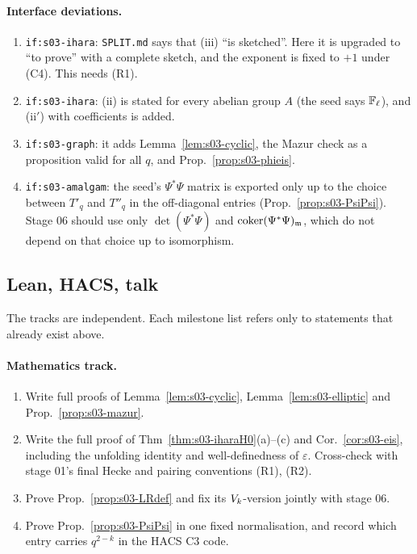\paragraph{Interface deviations.}
\begin{enumerate}[label=(D\arabic*)]
\item \texttt{if:s03-ihara}: \texttt{SPLIT.md} says that (iii) ``is sketched''. Here it is upgraded to ``to prove'' with a complete
  sketch, and the exponent is fixed to $+1$ under (C4). This needs (R1).
\item \texttt{if:s03-ihara}: (ii) is stated for every abelian group $A$ (the seed says $\mathbb{F}_\ell$), and (ii$'$) with coefficients is
  added.
\item \texttt{if:s03-graph}: it adds Lemma~\ref{lem:s03-cyclic}, the Mazur check as a proposition valid for all $q$, and
  Prop.~\ref{prop:s03-phieis}.
\item \texttt{if:s03-amalgam}: the seed's $\Psi^*\Psi$ matrix is exported only up to the choice between $T'_q$ and $T''_q$ in the
  off-diagonal entries (Prop.~\ref{prop:s03-PsiPsi}). Stage 06 should use only $\det(\Psi^*\Psi)$ and $\operatorname{coker}(\Psi^*\Psi)_{\mathfrak{m}}$, which
  do not depend on that choice up to isomorphism.
\end{enumerate}

\subsection{Lean, HACS, talk}
The tracks are independent. Each milestone list refers only to statements that already exist above.

\paragraph{Mathematics track.}
\begin{enumerate}[label=M\arabic*.]
\item Write full proofs of Lemma~\ref{lem:s03-cyclic}, Lemma~\ref{lem:s03-elliptic} and Prop.~\ref{prop:s03-mazur}.
\item Write the full proof of Thm~\ref{thm:s03-iharaH0}(a)--(c) and Cor.~\ref{cor:s03-eis}, including the unfolding identity and
  well-definedness of $\varepsilon$. Cross-check with stage 01's final Hecke and pairing conventions (R1), (R2).
\item Prove Prop.~\ref{prop:s03-LRdef} and fix its $V_k$-version jointly with stage 06.
\item Prove Prop.~\ref{prop:s03-PsiPsi} in one fixed normalisation, and record which entry carries $q^{2-k}$ in the HACS C3 code.
\end{enumerate}

